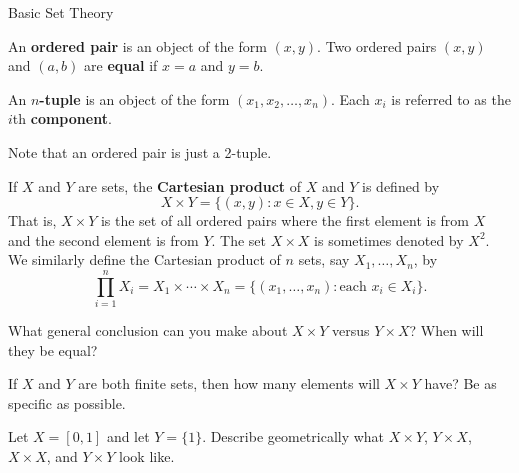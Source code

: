 \begin{section}{Basic Set Theory}
\begin{definition}
An \textbf{ordered pair} is an object of the form $(x,y)$. Two ordered pairs $(x,y)$ and $(a,b)$ are \textbf{equal} if $x=a$ and $y=b$. 
\end{definition}

\begin{definition}
An \textbf{$n$-tuple} is an object of the form $(x_1, x_2,\ldots,x_n)$.  Each $x_i$ is referred to as the $i$th \textbf{component}.
\end{definition}

Note that an ordered pair is just a 2-tuple.

\begin{definition}\label{def:cartesian_product}
If $X$ and $Y$ are sets, the \textbf{Cartesian product} of $X$ and $Y$ is defined by
\[
X\times Y=\{(x,y): x\in X, y\in Y\}.
\]
That is, $X\times Y$ is the set of all ordered pairs where the first element is from $X$ and the second element is from $Y$.  The set $X\times X$ is sometimes denoted by $X^2$.  We similarly define the Cartesian product of $n$ sets, say $X_1, \ldots, X_n$, by
\[
\prod_{i=1}^{n} X_i=X_1\times \cdots \times X_n=\{(x_1,\ldots,x_n): \mbox{each } x_i\in X_i\}.
\]
\end{definition}

\begin{exercise}
What general conclusion can you make about $X\times Y$ versus $Y\times X$?  When will they be equal?
\end{exercise}

\begin{exercise}
If $X$ and $Y$ are both finite sets, then how many elements will $X\times Y$ have?  Be as specific as possible.
\end{exercise}

\begin{exercise}
Let $X=[0,1]$ and let $Y=\{1\}$.  Describe geometrically what $X\times Y$, $Y\times X$, $X\times X$, and $Y\times Y$ look like.
\end{exercise}

\end{section}


